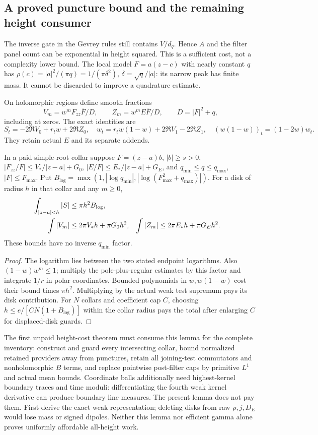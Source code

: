 \subsection{A proved puncture bound and the remaining height consumer}
The inverse gate in the Gevrey rules still contains $V/d_q$. Hence
$A$ and the filter panel count can be exponential in height squared.
This is a sufficient cost, not a complexity lower bound. The local
model $F=a(z-c)$ with nearly constant $q$ has
$\rho(c)=|a|^2/(\pi q)=1/(\pi\delta^2)$,
$\delta=\sqrt q/|a|$: its narrow peak has finite mass.
It cannot be discarded to improve a quadrature estimate.

On holomorphic regions define smooth fractions
\[
 V_m=w^mF_{zz}\bar F/D,\qquad Z_m=w^mE\bar F/D,
 \qquad D=|F|^2+q,
\]
including at zeros. The exact identities are
\[
 S_t=-2\Re V_0+r_tw+2\Re Z_0,\quad
 w_t=r_tw(1-w)+2\Re V_1-2\Re Z_1,
\quad (w(1-w))_t=(1-2w)w_t.
\]
They retain actual $E$ and its separate addends.
\begin{lemma}\label{lemma:weak-punctures}
In a paid simple-root collar suppose $F=(z-a)b$, $|b|\ge s>0$,
$|F_{zz}/F|\le V_*/|z-a|+G_0$,
$|E/F|\le E_*/|z-a|+G_E$, and
$q_{\min}\le q\le q_{\max}$, $|F|\le F_{\max}$. Put
$B_{\log}=\max(1,|\log q_{\min}|,
|\log(F_{\max}^2+q_{\max})|)$. For a disk of radius $h$ in that
collar and any $m\ge0$,
\begin{align}
 \int_{|z-a|<h}|S|&\le\pi h^2B_{\log},\notag\\
 \int|V_m|&\le2\pi V_*h+\pi G_0h^2,&
 \int|Z_m|&\le2\pi E_*h+\pi G_Eh^2.
 \label{eq:pc-punctures}
\end{align}
These bounds have no inverse $q_{\min}$ factor.
\end{lemma}
\begin{proof}
The logarithm lies between the two stated endpoint logarithms.
Also $(1-w)w^m\le1$; multiply the pole-plus-regular estimates by
this factor and integrate $1/r$ in polar coordinates. Bounded
polynomials in $w,w(1-w)$ cost their bound times $\pi h^2$.
Multiplying by the actual weak test supremum pays its disk contribution.
For $N$ collars and coefficient cap $C$, choosing
$h\le e/[CN(1+B_{\log})]$ within the collar radius pays the
total after enlarging $C$ for displaced-disk guards.
\end{proof}
The first unpaid height-cost theorem must consume this lemma for the
complete inventory: construct and guard every intersecting collar,
bound normalized retained providers away from punctures, retain all
joining-test commutators and nonholomorphic $B$ terms, and replace
pointwise post-filter caps by primitive $L^1$ and actual mean bounds.
Coordinate balls additionally need highest-kernel boundary traces and
time moduli: differentiating the fourth weak kernel derivative can
produce boundary line measures. The present lemma does not pay them.
First derive the exact weak representation; deleting disks from raw
$\rho,j,D_E$ would lose mass or signed dipoles. Neither this lemma
nor efficient gamma alone proves uniformly affordable all-height work.
